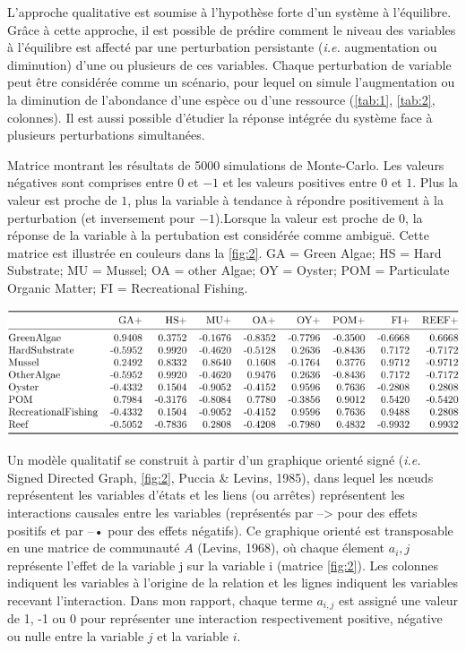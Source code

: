 \documentclass[12pt]{report}
\begin{document}
L’approche qualitative est soumise à l’hypothèse forte d'un système à l'équilibre. Grâce à cette approche, il est possible de prédire comment le niveau des variables à l’équilibre est affecté par une perturbation persistante (\textit{i.e.} augmentation ou diminution) d’une ou plusieurs de ces variables. Chaque perturbation de variable peut être considérée comme un scénario, pour lequel on simule l’augmentation ou la diminution de l’abondance d’une espèce ou d’une ressource (\autoref{tab:1}, \autoref{tab:2}, colonnes). Il est aussi possible d’étudier la réponse intégrée du système face à plusieurs perturbations simultanées.
\newline \newline
\begin{table}[t]
    \centering
    \vspace{-5mm}
    \caption[Matrice indiquant le type de réponse de chaque variable après une perturbation]{Matrice montrant les résultats de 5000 simulations de Monte-Carlo. Les valeurs négatives sont comprises entre $0$ et $-1$ et les valeurs positives entre $0$ et $1$. Plus la valeur est proche de $1$, plus la variable à tendance à répondre positivement à la perturbation (et inversement pour $-1$).Lorsque la valeur est proche de $0$, la réponse de la variable à la pertubation est considérée comme ambiguë. Cette matrice est illustrée en couleurs dans la \autoref{fig:2}. GA = Green Algae; HS = Hard Substrate; MU = Mussel; OA = other Algae; OY = Oyster; POM = Particulate Organic Matter; FI = Recreational Fishing.}
    \includegraphics[width = \linewidth]{community_matrix.PNG}
    \vspace{-10mm}
    \label{tab:1}
\end{table}
Un modèle qualitatif se construit à partir d'un graphique orienté signé (\textit{i.e.} Signed Directed Graph, \autoref{fig:2},  Puccia \& Levins, 1985), dans lequel les nœuds représentent les variables d’états et les liens (ou arrêtes) représentent les interactions causales entre les variables (représentés par --> pour des effets positifs et par --• pour des effets négatifs). Ce graphique orienté est transposable en une matrice de communauté $A$ (Levins, 1968), où chaque élement $a_i,j$ représente l'effet de la variable j sur la variable i (matrice \autoref{fig:2}). Les colonnes indiquent les variables à l’origine de la relation et les lignes indiquent les variables recevant l’interaction. Dans mon rapport, chaque terme $a_{i,j}$ est assigné une valeur de 1, -1 ou 0 pour représenter une interaction respectivement positive, négative ou nulle entre la variable $j$ et la variable $i$.
\end{document}
